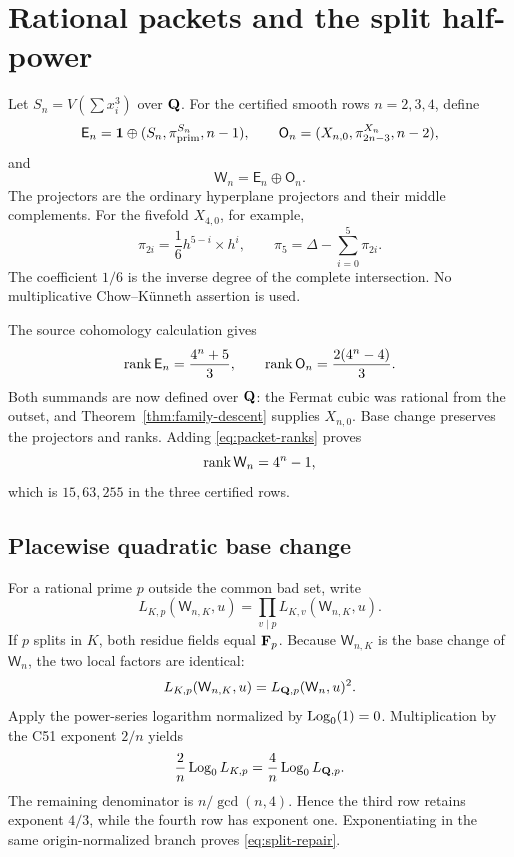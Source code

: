 \section{Rational packets and the split half-power}
\label{sec:rational-packets}

Let \(S_n=V(\sum x_i^3)\) over \(\mathbf Q\).  For the certified smooth rows
\(n=2,3,4\), define
\[
\mathsf E_n=\mathbf 1\oplus(S_n,\pi_{\mathrm{prim}}^{S_n},n-1),
\qquad
\mathsf O_n=(X_{n,0},\pi_{2n-3}^{X_n},n-2),
\]
and
\[
\mathsf W_n=\mathsf E_n\oplus\mathsf O_n.
\]
The projectors are the ordinary hyperplane projectors and their middle
complements.  For the fivefold \(X_{4,0}\), for example,
\begin{equation}
\pi_{2i}=\frac16h^{5-i}\times h^i,\qquad
\pi_5=\Delta-\sum_{i=0}^5\pi_{2i}.
\label{eq:pi5}
\end{equation}
The coefficient \(1/6\) is the inverse degree of the complete
intersection.  No multiplicative Chow--K\"unneth assertion is used.

The source cohomology calculation gives
\begin{equation}
\operatorname{rank}\mathsf E_n=\frac{4^n+5}{3},\qquad
\operatorname{rank}\mathsf O_n=\frac{2(4^n-4)}3.
\label{eq:packet-ranks}
\end{equation}
Both summands are now defined over \(\mathbf Q\): the Fermat cubic was rational
from the outset, and Theorem~\ref{thm:family-descent} supplies
\(X_{n,0}\).  Base change preserves the projectors and ranks.  Adding
\eqref{eq:packet-ranks} proves
\[
\operatorname{rank}\mathsf W_n=4^n-1,
\]
which is \(15,63,255\) in the three certified rows.

\subsection{Placewise quadratic base change}

For a rational prime \(p\) outside the common bad set, write
\[
L_{K,p}(\mathsf W_{n,K},u)
=\prod_{v\mid p}L_{K,v}(\mathsf W_{n,K},u).
\]
If \(p\) splits in \(K\), both residue fields equal \(\mathbf F_p\).
Because \(\mathsf W_{n,K}\) is the base change of \(\mathsf W_n\), the
two local factors are identical:
\begin{equation}
L_{K,p}(\mathsf W_{n,K},u)
=L_{\mathbf Q,p}(\mathsf W_n,u)^2.
\label{eq:split-square}
\end{equation}
Apply the power-series logarithm normalized by \(\operatorname{Log}_0(1)=0\).
Multiplication by the C51 exponent \(2/n\) yields
\[
\frac2n\operatorname{Log}_0 L_{K,p}
=\frac4n\operatorname{Log}_0 L_{\mathbf Q,p}.
\]
The remaining denominator is \(n/\gcd(n,4)\).  Hence the third row
retains exponent \(4/3\), while the fourth row has exponent one.
Exponentiating in the same origin-normalized branch proves
\eqref{eq:split-repair}.

